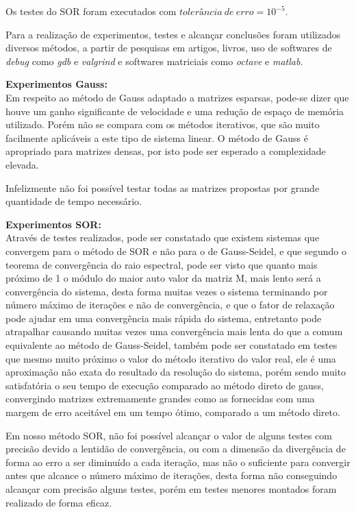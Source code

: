 \documentclass[
	article,			%
	11pt,				%
	oneside,			%
	a4paper,			%
	english,			%
	brazil,				%
	sumario=tradicional
	]{abntex2}
\begin{document}
Os testes do SOR foram executados com \textit{$ tolerância\ de\ erro = 10^{-5} $}.

Para a realização de experimentos, testes e alcançar conclusões foram utilizados diversos métodos, a partir de pesquisas em artigos, livros, uso de softwares de \textit{debug} como \textit{gdb} e \textit{valgrind} e softwares matriciais como \textit{octave} e \textit{matlab}. 

\textbf{Experimentos Gauss:}\\
\indent
Em respeito ao método de Gauss adaptado a matrizes esparsas, pode-se dizer que houve um ganho significante de velocidade e uma redução de espaço de memória utilizado. Porém não se compara com os métodos iterativos, que são muito facilmente aplicáveis a este tipo de sistema linear. O método de Gauss é apropriado para matrizes densas, por isto pode ser esperado a complexidade elevada.

Infelizmente não foi possível testar todas as matrizes propostas por grande quantidade de tempo necessário.

\textbf{Experimentos SOR:}\\
\indent
Através de testes realizados, pode ser constatado que existem sistemas que convergem para o método de SOR e não para o de Gauss-Seidel, e que segundo o teorema de convergência do raio espectral, pode ser visto que quanto mais próximo de 1 o módulo do maior auto valor da matriz M, mais lento será a convergência do sistema, desta forma muitas vezes o sistema terminando por número máximo de iterações e não de convergência, e que o fator de relaxação pode ajudar em uma convergência mais rápida do sistema, entretanto pode atrapalhar causando muitas vezes uma convergência mais lenta do que a comum equivalente ao método de Gauss-Seidel, também pode ser constatado em testes que mesmo muito próximo o valor do método iterativo do valor real, ele é uma aproximação não exata do resultado da resolução do sistema, porém sendo muito satisfatória o seu tempo de execução comparado ao método direto de gauss, convergindo matrizes extremamente grandes como as fornecidas com uma margem de erro aceitável em um tempo ótimo, comparado a um método direto.

Em nosso método SOR, não foi possível alcançar o valor de alguns testes com precisão devido a lentidão de convergência, ou com a dimensão da divergência de forma ao erro a ser diminuído a cada iteração, mas não o suficiente para convergir antes que alcance o número máximo de iterações, desta forma não conseguindo alcançar com precisão alguns testes, porém em testes menores montados foram realizado de forma eficaz.
\end{document}
